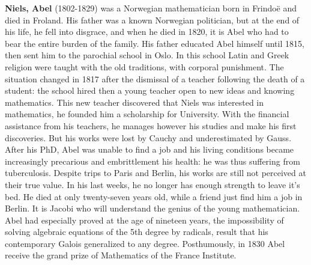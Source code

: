 \textbf{Niels, Abel} (1802-1829) was a Norwegian mathematician born in Frindoë and died in Froland. His father was a known Norwegian politician, but at the end of his life, he fell into disgrace, and when he died in 1820, it is Abel who had to bear the entire burden of the family. His father educated Abel himself until 1815, then sent him to the parochial school in Oslo. In this school Latin and Greek religion were taught with the old traditions, with corporal punishment. The situation changed in 1817 after the dismissal of a teacher following the death of a student: the school hired then a young teacher open to new ideas and knowing mathematics. This new teacher discovered that Niels was interested in mathematics, he founded him a scholarship for University. With the financial assistance from his teachers, he manages however his studies and make his first discoveries. But his works were lost by Cauchy and underestimated by Gauss. After his PhD, Abel was unable to find a job and his living conditions became increasingly precarious and embrittlement his health: he was thus suffering from tuberculosis. Despite trips to Paris and Berlin, his works are still not perceived at their true value. In his last weeks, he no longer has enough strength to leave it's bed. He died at only twenty-seven years old, while a friend just find him a job in Berlin. It is Jacobi who will understand the genius of the young mathematician. Abel had especially proved at the age of nineteen years, the impossibility of solving algebraic equations of the 5th degree by radicals, result that his contemporary Galois generalized to any degree. Posthumously, in 1830 Abel receive the grand prize of Mathematics of the France Institute.

